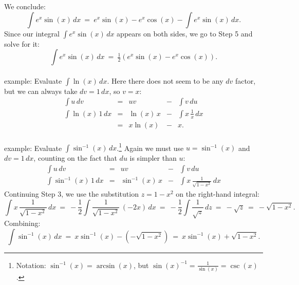 \documentclass[11pt]{article}
\newcommand{\ts}{\textstyle}
\begin{document}
We conclude:
$$
\int e^x\sin(x)\,dx \ =\ 
e^x\sin(x) -e^x\cos(x) -\int e^x\sin(x)\,dx.
$$
Since our integral $\int e^x\sin(x)\,dx$ appears on both sides, we go to Step 5 
and solve for it:
$$
\int e^x\sin(x)\,dx\ =\ 
\tfrac12\left(e^x\sin(x)-e^x\cos(x)\right).
$$
\\[-.2em]
\noindent 
{\sc example:} Evaluate $\int \ln(x)\,dx$.
Here there does not seem to be any $dv$ factor, but we can always take $dv=1\,dx$, so $v = x$:
$$\begin{array}{ccccc}
\int u\,dv & = & uv & - & \int v\,du 
\\[.5em]
\int \ln(x)\,1\,dx
&=&
\ln(x)\,x &-& \int x\,\frac1x\,dx
\\[.5em]
&=&
x\ln(x)&-&x.
\end{array}$$
\\[-0em]
\noindent 
{\sc example:} Evaluate $\int \sin^{-1}(x)\,dx$.\footnote{
Notation: $\sin^{-1}(x)=\arcsin(x)$, but $\sin(x)^{-1}=\frac{1}{\sin(x)}=\csc(x)$.
}
Again we must use $u=\sin^{-1}(x)$ and $dv = 1\,dx$, counting on the fact that $du$ is simpler than $u$:
$$\begin{array}{ccccc}
\int u\,dv & = & uv & - & \int v\,du 
\\[.5em]
\int \sin^{-1}(x)\,1\,dx
&=&
\sin^{-1}(x)\,x &-& \int x\,\frac1{\sqrt{1-x^2}}\,dx
\end{array}$$
Continuing Step 3, we use the substitution $z = 1-x^2$ on the right-hand integral:
$$\ts
\int x\,\frac1{\sqrt{1-x^2}}\,dx
\ =\
-\frac12 \int \frac1{\sqrt{1-x^2}}\,(-2x)\,dx
\ =\
-\frac12\int \frac1{\sqrt z}\,dz
\ =\
-\sqrt{z}
\ =\
-\sqrt{1{-}x^2}.
$$
Combining:
$$\ts
\int \sin^{-1}(x)\,dx
\ =\
x\sin^{-1}(x) - (-\sqrt{1{-}x^2})
\ =\
x\sin^{-1}(x) + \sqrt{1{-}x^2}.
$$
\end{document}

